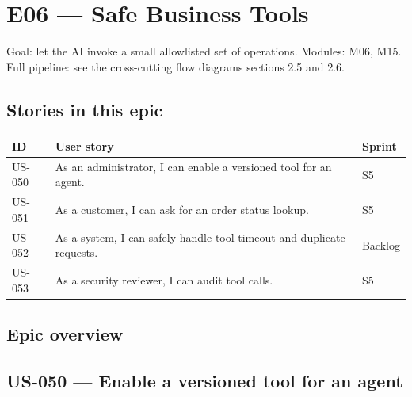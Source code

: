 \chapter{E06 --- Safe Business Tools}

Goal: let the AI invoke a small allowlisted set of operations. Modules: M06, M15. Full pipeline: see the cross-cutting flow diagrams sections 2.5 and 2.6.

\section*{Stories in this epic}
{\small
\begin{longtable}{@{}>{\raggedright\arraybackslash}p{}>{\raggedright\arraybackslash}p{}>{\raggedright\arraybackslash}p{}@{}}
\toprule
\textbf{ID} & \textbf{User story} & \textbf{Sprint} \\
\midrule
\endhead
\bottomrule
\endfoot
US-050 & As an administrator, I can enable a versioned tool for an agent. & S5 \\
US-051 & As a customer, I can ask for an order status lookup. & S5 \\
US-052 & As a system, I can safely handle tool timeout and duplicate requests. & Backlog \\
US-053 & As a security reviewer, I can audit tool calls. & S5 \\
\end{longtable}
}

\Needspace{172pt}
\section{Epic overview}





\Needspace{640pt}
\section{US-050 --- Enable a versioned tool for an agent}

